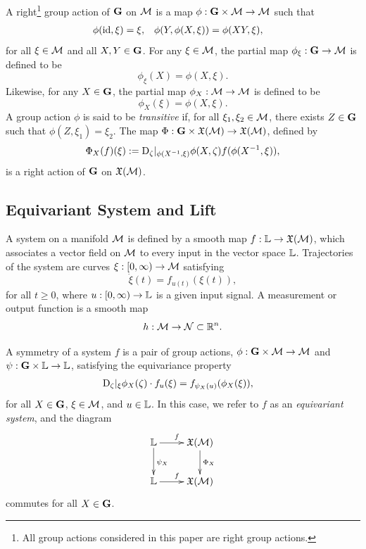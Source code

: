 \documentclass{article}
\begin{document}
A right\footnote{All group actions considered in this paper are right group actions.} group action of $\mathbf{G}$ on $\mathcal{M}$ is a map $\phi : \mathbf{G} \times \mathcal{M} \to \mathcal{M}$ such that
\begin{align*}
    \phi(\mathrm{id}, \xi) &= \xi, &
    \phi(Y, \phi(X, \xi)) &= \phi(X Y, \xi),
\end{align*}
for all $\xi \in \mathcal{M}$ and all $X,Y \in \mathbf{G}$.
For any $\xi \in \mathcal{M}$, the partial map $\phi_\xi : \mathbf{G} \to \mathcal{M}$ is defined to be 
$$\phi_\xi(X) = \phi(X, \xi).$$
Likewise, for any $X \in \mathbf{G}$, the partial map $\phi_X : \mathcal{M} \to \mathcal{M}$ is defined to be 
$$\phi_X(\xi) = \phi(X, \xi).$$
A group action $\phi$ is said to be \emph{transitive} if, for all $\xi_1, \xi_2 \in \mathcal{M}$, there exists $Z \in \mathbf{G}$ such that $\phi(Z, \xi_1) = \xi_2$.
The map $\Phi : \mathbf{G} \times \mathfrak{X}(\mathcal{M}) \to \mathfrak{X}(\mathcal{M})$, defined by
\begin{align*}
    \Phi_X(f)(\xi) := \mathrm{D}_\zeta |_{\phi(X^{-1}, \xi)} \phi(X, \zeta) f(\phi(X^{-1}, \xi)),
\end{align*}
is a right action of $\mathbf{G}$ on $\mathfrak{X}(\mathcal{M})$.


\subsection{Equivariant System and Lift}

A system on a manifold $\mathcal{M}$ is defined by a smooth map $f : \mathbb{L} \to \mathfrak{X}(\mathcal{M})$, which associates a vector field on $\mathcal{M}$ to every input in the vector space $\mathbb{L}$.
Trajectories of the system are curves $\xi : [0, \infty) \to \mathcal{M}$ satisfying 
$$\dot{\xi}(t) = f_{u(t)}(\xi(t)),$$
for all $t \geq 0$, where $u:[0,\infty) \to \mathbb{L}$ is a given input signal.
A measurement or output function is a smooth map 
$$h : \mathcal{M} \to \mathcal{N} \subset \mathbb{R}^n.$$

A symmetry of a system $f$ is a pair of group actions, $\phi : \mathbf{G} \times \mathcal{M} \to \mathcal{M}$ and $\psi : \mathbf{G} \times \mathbb{L} \to \mathbb{L}$, satisfying the equivariance property
\begin{align}
    \mathrm{D}_\zeta |_\xi \phi_X (\zeta) \cdot f_u(\xi) &= f_{\psi_X(u)}(\phi_X(\xi)),
\end{align}
for all $X \in \mathbf{G}$, $\xi \in \mathcal{M}$, and $u \in \mathbb{L}$.
In this case, we refer to $f$ as an \emph{equivariant system}, and the diagram
\[
\xymatrix{
\vecL
\ar[r]^{f}
\ar[d]^{\psi_X}
&
\gothX(\calM)
\ar[d]^{\Phi_X} 
\\
\vecL
\ar[r]^{f}
&
\gothX(\calM)
}
\]
commutes for all $X \in \mathbf{G}$.
\end{document}
